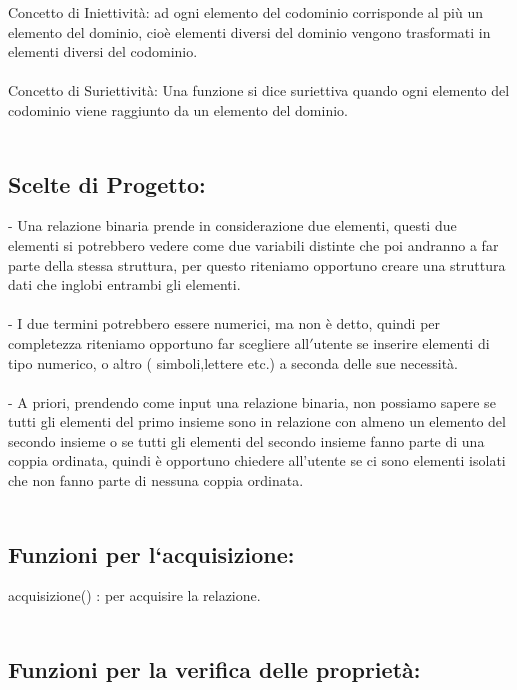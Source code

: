 \documentclass[11pt, a4paper, titlepage, block]{article}
\begin{document}
Concetto di Iniettivit\`a: ad ogni elemento del codominio corrisponde al pi\`u
un elemento del dominio, cio\`e elementi diversi del dominio
vengono trasformati in elementi diversi del codominio.\\
\\
Concetto di Suriettivit\`a: Una funzione si dice suriettiva quando ogni elemento del codominio viene raggiunto da un elemento del dominio.\\
\\
\newpage
\subsection{Scelte di Progetto:}

- Una relazione binaria prende in considerazione due elementi, questi due elementi si potrebbero vedere come due variabili distinte che poi andranno a far parte della stessa struttura, per questo riteniamo opportuno creare una struttura dati che inglobi entrambi gli elementi.\\
\\
- I due termini potrebbero essere numerici, ma non \`e detto, quindi per completezza riteniamo opportuno far scegliere all$'$utente se inserire elementi di tipo numerico, o altro ( simboli,lettere etc.) a seconda delle sue necessit\`a.\\
\\
- A priori, prendendo come input una relazione binaria, non possiamo sapere se tutti gli elementi del primo insieme sono in relazione con almeno un elemento del secondo insieme o se tutti gli elementi del secondo insieme fanno parte di una coppia ordinata, quindi \`e opportuno chiedere all'utente se ci sono elementi isolati che non fanno parte di nessuna coppia ordinata.\\
\\ 
\newpage
	\subsection{Funzioni per l`acquisizione:}
	
	acquisizione() : per acquisire la relazione.\\
	\\
	
	\subsection{Funzioni per la verifica delle propriet\`a:}
\end{document}
